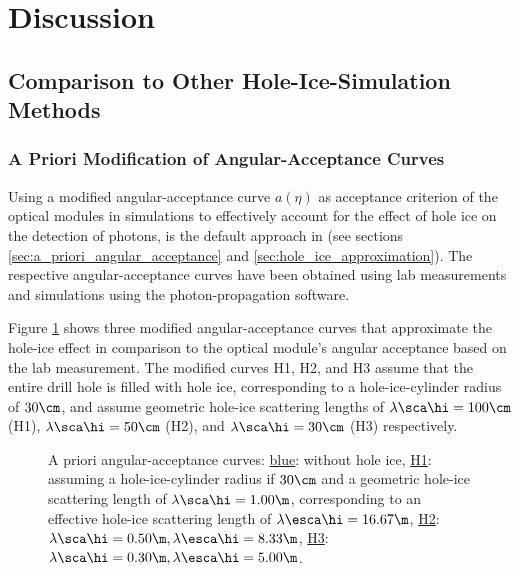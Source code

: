 
\section{Discussion}
\label{sec:discussion}

\subsection{Comparison to Other Hole-Ice-Simulation Methods}
\label{sec:comparison_methods}

\subsubsection{A Priori Modification of Angular-Acceptance Curves}
\label{sec:a_priori_modification_of_angular_acception_curves}\label{sec:a_priori_curve}


Using a modified angular-acceptance curve $a(\eta)$ as acceptance criterion of the optical modules in simulations to effectively account for the effect of hole ice on the detection of photons, is the default approach in \clsim (see sections \ref{sec:a_priori_angular_acceptance} and \ref{sec:hole_ice_approximation}).
The respective angular-acceptance curves have been obtained using lab measurements and simulations using the \photonics photon-propagation software. \cite{icepaper, lundberg, photonics}


Figure \ref{fig:Wee4ahYa} shows three modified angular-acceptance curves that approximate the hole-ice effect in comparison to the optical module's angular acceptance based on the lab measurement. The modified curves H1, H2, and H3 assume that the entire drill hole is filled with hole ice, corresponding to a hole-ice-cylinder radius of $30\cm$, and assume geometric hole-ice scattering lengths of $\lambda\sca\hi = 100\cm$ (H1), $\lambda\sca\hi = 50\cm$ (H2), and $\lambda\sca\hi = 30\cm$ (H3) respectively.

\begin{figure}[htbp]
  \caption{A priori angular-acceptance curves: \underline{blue}: without hole ice, \underline{H1}: assuming a hole-ice-cylinder radius if $30\cm$ and a geometric hole-ice scattering length of $\lambda\sca\hi = 1.00\m$, corresponding to an effective hole-ice scattering length of $\lambda\esca\hi = 16.67\m$, \underline{H2}: $\lambda\sca\hi = 0.50\m, \lambda\esca\hi = 8.33\m$, \underline{H3}: $\lambda\sca\hi = 0.30\m, \lambda\esca\hi = 5.00\m$. \cite{icepaper, yag, icemodelsdata}}
  \label{fig:Wee4ahYa}
\end{figure}

